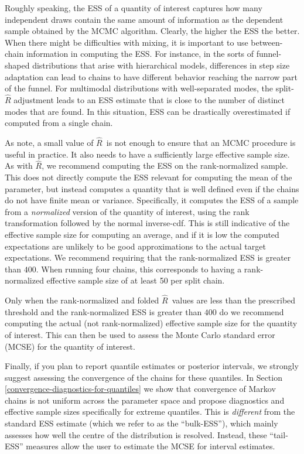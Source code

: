 \documentclass[american,]{article}
\newcommand{\Rhat}{$\widehat{R}$}
\theoremstyle{definition}
\begin{document}
Roughly speaking, the ESS of a quantity of interest captures how many
independent draws contain the same amount of information as the dependent 
sample obtained by the MCMC algorithm. Clearly, the higher the ESS the better.
When there might be difficulties with mixing, it is important to use between-chain 
information in computing the ESS. For instance, in the sorts of
funnel-shaped distributions that arise with hierarchical models, differences 
in step size adaptation can lead to chains to have
different behavior reaching the narrow part of the funnel. For multimodal 
distributions with well-separated modes, the split-\(\widehat{R}\)
adjustment leads to an ESS estimate that is close to the number of
distinct modes that are found. 
In this situation, ESS can be drastically overestimated if computed from a single chain.

As \citet{vats2018revisiting} note, a small value of \Rhat\ is not enough to ensure 
that an MCMC procedure is useful in practice. It also needs to have a sufficiently
large effective sample size. As with \Rhat, we 
recommend computing the ESS on the rank-normalized sample. This does not
directly compute the ESS relevant for computing the mean of the parameter, but 
instead computes a quantity that is well defined even if the chains do not 
have finite mean or variance.  Specifically, it computes the ESS of a sample
from a \emph{normalized} version of the quantity of interest, using the rank transformation followed by the normal inverse-cdf. This is still indicative of the effective sample size for computing an average, and if it is low the computed
expectations are unlikely to be good approximations to the actual
target expectations.  We recommend requiring that the rank-normalized ESS is 
 greater than $400$. When running four chains, this corresponds to having
a rank-normalized effective sample size of at least 50 per split chain.

Only when the rank-normalized and folded \Rhat\ values are less than the
prescribed threshold and the rank-normalized ESS is greater than $400$ do we recommend
computing the actual (not rank-normalized) effective sample size for the 
quantity of interest. This can then be used to assess the Monte Carlo standard error (MCSE) for the quantity
of interest.

Finally, if you plan to report quantile estimates or posterior intervals, we 
strongly suggest assessing the convergence of the chains for these quantiles.
In Section \ref{convergence-diagnostics-for-quantiles} we show that
convergence of Markov chains is not uniform across the parameter space
and propose diagnostics and effective sample sizes specifically for extreme 
quantiles. This is \emph{different} from the standard ESS estimate (which 
we refer to as the ``bulk-ESS''), which mainly assesses how well
the centre of the distribution is resolved. Instead, these ``tail-ESS''
measures allow the user to estimate the MCSE for interval estimates.
\end{document}
